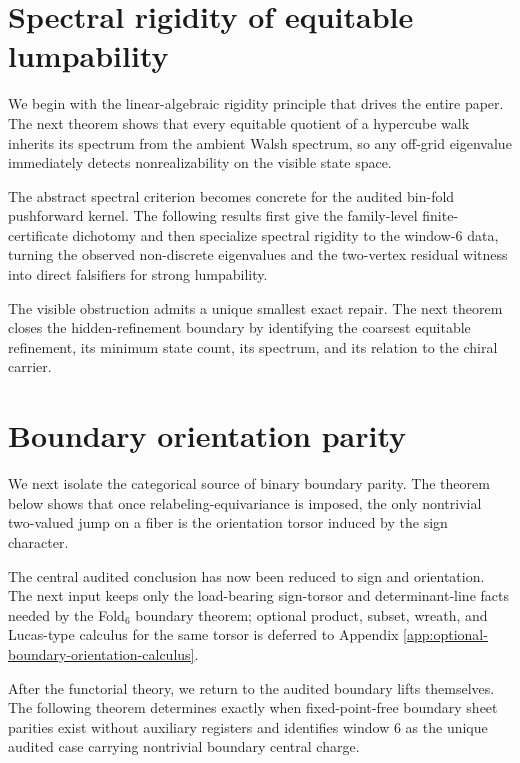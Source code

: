 \documentclass[12pt,a4paper]{article}
\theoremstyle{plain}
\theoremstyle{definition}
\numberwithin{equation}{section}
\begin{document}
\section{Spectral rigidity of equitable lumpability}\label{sec:spectral-rigidity}
We begin with the linear-algebraic rigidity principle that drives the entire paper. The next theorem shows that every equitable quotient of a hypercube walk inherits its spectrum from the ambient Walsh spectrum, so any off-grid eigenvalue immediately detects nonrealizability on the visible state space.


The abstract spectral criterion becomes concrete for the audited bin-fold pushforward kernel. The following results first give the family-level finite-certificate dichotomy and then specialize spectral rigidity to the window-\(6\) data, turning the observed non-discrete eigenvalues and the two-vertex residual witness into direct falsifiers for strong lumpability.



The visible obstruction admits a unique smallest exact repair.  The next theorem closes the hidden-refinement boundary by identifying the coarsest equitable refinement, its minimum state count, its spectrum, and its relation to the chiral carrier.


\section{Boundary orientation parity}\label{sec:boundary-parity}
We next isolate the categorical source of binary boundary parity. The theorem below shows that once relabeling-equivariance is imposed, the only nontrivial two-valued jump on a fiber is the orientation torsor induced by the sign character.


The central audited conclusion has now been reduced to sign and orientation.  The next input keeps only the load-bearing sign-torsor and determinant-line facts needed by the Fold\(_6\) boundary theorem; optional product, subset, wreath, and Lucas-type calculus for the same torsor is deferred to Appendix \ref{app:optional-boundary-orientation-calculus}.


After the functorial theory, we return to the audited boundary lifts themselves. The following theorem determines exactly when fixed-point-free boundary sheet parities exist without auxiliary registers and identifies window \(6\) as the unique audited case carrying nontrivial boundary central charge.

\end{document}
